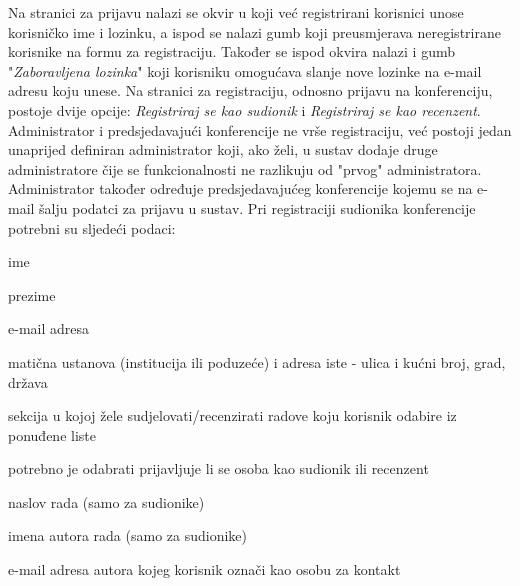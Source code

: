 		\newline
		Na stranici za prijavu nalazi se okvir u koji već registrirani korisnici unose korisničko ime i lozinku, a ispod se nalazi gumb koji preusmjerava neregistrirane korisnike na formu za registraciju. Također se ispod okvira nalazi i gumb "\textit{Zaboravljena lozinka}" koji korisniku omogućava slanje nove lozinke na e-mail adresu koju unese. Na stranici za registraciju, odnosno prijavu na konferenciju, postoje dvije opcije: \textit{Registriraj se kao sudionik} i \textit{Registriraj se kao recenzent}. Administrator i predsjedavajući konferencije ne vrše registraciju, već postoji jedan unaprijed definiran administrator koji, ako želi, u sustav dodaje druge administratore čije se funkcionalnosti ne razlikuju od "prvog" administratora. Administrator također određuje predsjedavajućeg konferencije kojemu se na e-mail šalju podatci za prijavu u sustav.
		\newline
		\newline
		Pri registraciji sudionika konferencije potrebni su sljedeći podaci:

		\begin{packed_item}

			\item ime
			\item prezime
			\item e-mail adresa
			\item matična ustanova (institucija ili poduzeće) i adresa iste - ulica i kućni broj, grad, država
			\item sekcija u kojoj žele sudjelovati/recenzirati radove koju korisnik odabire iz ponuđene liste
			\item potrebno je odabrati prijavljuje li se osoba kao sudionik ili recenzent
			\item naslov rada (samo za sudionike)
			\item imena autora rada (samo za sudionike)
			\item e-mail adresa autora kojeg korisnik označi kao osobu za kontakt
		
		\end{packed_item}
	
